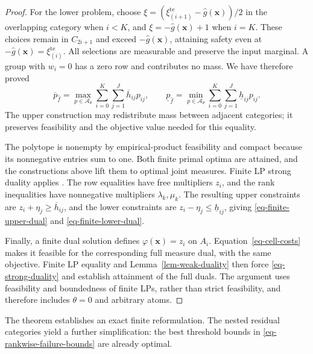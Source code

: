 \documentclass[review,11pt,3p,authoryear,nopreprintline]{elsarticle}
\begin{document}
\begin{proof}
  For the lower problem, choose
  $\xi=\left(\xi_{(i+1)}^{\mathrm{te}}-\hat g(\bm x)\right)/2$ in the overlapping category when $i<K$, and $\xi=-\hat g(\bm x)+1$ when $i=K$. These choices remain in $C_{2i+1}$ and exceed $-\hat g(\bm x)$, attaining safety even at $-\hat g(\bm x)=\xi_{(i)}^{\mathrm{te}}$. All selections are measurable and preserve the input marginal. A group with $w_i=0$ has a zero row and contributes no mass. We have therefore proved
  \begin{equation}
    \overline p_{\hat f}
    =\max_{p\in\mathcal A_\theta}\sum_{i=0}^K\sum_{j=1}^J
      \overline h_{ij}p_{ij},\qquad
    \underline p_{\hat f}
    =\min_{p\in\mathcal A_\theta}\sum_{i=0}^K\sum_{j=1}^J
      \underline h_{ij}p_{ij}.
    \label{eq-finite-primal-values}
  \end{equation}
  The upper construction may redistribute mass between adjacent categories; it preserves feasibility and the objective value needed for this equality.

  The polytope is nonempty by empirical-product feasibility and compact because its nonnegative entries sum to one. Both finite primal optima are attained, and the constructions above lift them to optimal joint measures. Finite LP strong duality applies \citep[Section~5.2.3]{B.V04}. The row equalities have free multipliers $z_i$, and the rank inequalities have nonnegative multipliers $\lambda_k,\mu_k$. The resulting upper constraints are $z_i+\eta_j\ge\overline h_{ij}$, and the lower constraints are $z_i-\eta_j\le\underline h_{ij}$, giving \eqref{eq-finite-upper-dual} and \eqref{eq-finite-lower-dual}.

  Finally, a finite dual solution defines $\varphi(\bm x)=z_i$ on $A_i$. Equation~\eqref{eq-cell-costs} makes it feasible for the corresponding full measure dual, with the same objective. Finite LP equality and Lemma~\ref{lem-weak-duality} then force \eqref{eq-strong-duality} and establish attainment of the full duals. The argument uses feasibility and boundedness of finite LPs, rather than strict feasibility, and therefore includes $\theta=0$ and arbitrary atoms.
\end{proof}

The theorem establishes an exact finite reformulation. The nested residual categories yield a further simplification: the best threshold bounds in \eqref{eq-rankwise-failure-bounds} are already optimal.
\end{document}
